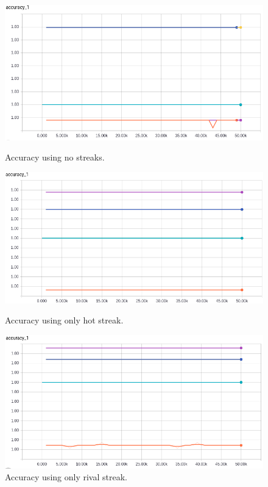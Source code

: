 \documentclass{article} %
\begin{document}
\begin{figure}[!htb]
  \includegraphics[width=\linewidth]{plots/model1/oneshot/streak-/accuracy.png}
  \caption{Accuracy using no streaks.}\label{fig:oneshot--accuracy}
\endminipage\hfill
{}
  \includegraphics[width=\linewidth]{plots/model1/oneshot/streak-h/accuracy.png}
  \caption{Accuracy using only hot streak.}\label{fig:oneshot-h-accuracy}
\endminipage\hfill
{}%
  \includegraphics[width=\linewidth]{plots/model1/oneshot/streak-r/accuracy.png}
  \caption{Accuracy using only rival streak.}\label{fig:oneshot-r-accuracy}

\end{figure}
\end{document}
